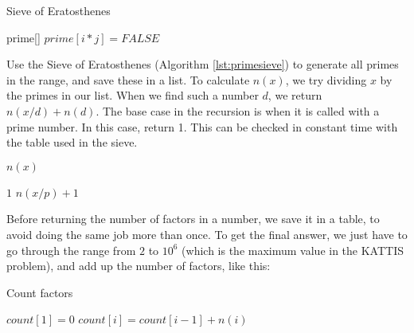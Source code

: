 \documentclass[11pt,a4paper,twoside]{article}
\begin{document}
\begin{algorithm}
    \caption{Sieve of Eratosthenes}
    \label{lst:primesieve}
    \begin{algorithmic}
        \STATE prime[] 
                \STATE $prime[i*j] = FALSE$
            \ENDFOR
        \ENDFOR
    \end{algorithmic}
\end{algorithm}
            
Use the Sieve of Eratosthenes (Algorithm \ref{lst:primesieve}) to generate all
primes in the range, and save these in a list. To calculate $n(x)$, we try
dividing $x$ by the primes in our list. When we find such a number $d$, we
return $n(x/d) + n(d)$. The base case in the recursion is when it is called
with a prime number. In this case, return 1.  This can be checked in constant
time with the table used in the sieve.


\begin{algorithm}
    \caption{$n(x)$}
    \label{lst:nx}
    \begin{algorithmic}
            \RETURN $1$
        \ENDIF
                \RETURN $n(x/p) + 1$
            \ENDIF
        \ENDFOR
    \end{algorithmic}
\end{algorithm}
    

Before returning the number of factors in a number, we save it in a table, to
avoid doing the same job more than once. To get the final answer, we just have
to go through the range from $2$ to $10^6$ (which is the maximum value in the
KATTIS problem), and add up the number of factors, like this:


\begin{algorithm}
    \caption{Count factors}
    \label{factorcount}
    \begin{algorithmic}
        \STATE $count[1] = 0$
            \STATE $count[i] = count[i-1] + n(i)$
        \ENDFOR
    \end{algorithmic}
\end{algorithm}
\end{document}
